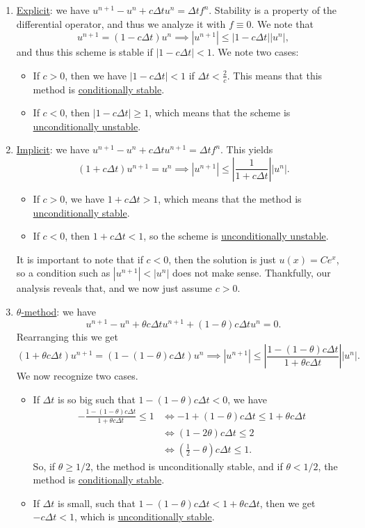 \documentclass{article}
\begin{document}
\begin{enumerate}
    \item \underline{Explicit}: we have $u^{n+1}-u^n + c\Delta t u^n = \Delta t f^n$. Stability is a property of the differential operator, and thus we analyze it with $f\equiv 0$. We note that
    $$u^{n+1} = (1-c\Delta t)u^n \implies |u^{n+1}|\leq |1-c\Delta t||u^n|,$$
    and thus this scheme is stable if $|1-c\Delta t|< 1$. We note two cases:
    \begin{itemize}
        \item If $c > 0$, then we have $|1-c\Delta t|<1$ if $\Delta t < \frac{2}{c}$. This means that this method is \underline{conditionally stable}. 
        \item If $c< 0$, then $|1-c\Delta t|\geq 1$, which means that the scheme is \underline{unconditionally unstable}.
    \end{itemize} 
    \item \underline{Implicit}: we have $u^{n+1}-u^n + c\Delta tu^{n+1} = \Delta t f^n$. This yields
    $$(1+c\Delta t) u^{n+1} = u^n \implies |u^{n+1}| \leq \left|\frac{1}{1+c\Delta t}\right| |u^{n}|.$$
    \begin{itemize}
        \item If $c > 0$,  we have $1+c\Delta t >1$, which means that the method is \underline{unconditionally stable}. 
        \item If $c < 0$, then $1+c\Delta t <1$, so the scheme is \underline{unconditionally unstable}.
    \end{itemize}     
    It is important to note that if $c<0$, then the solution is just $u(x) = Ce^x$, so a condition such as $|u^{n+1}|<|u^n|$ does not make sense. Thankfully, our analysis reveals that, and we now just assume $c>0$. 
    \item \underline{$\theta$-method}: we have
    $$
    u^{n+1}-u^n + \theta c\Delta t u^{n+1} + (1-\theta)c\Delta t u^n = 0.
    $$
    Rearranging this we get
    $$
    (1+\theta c\Delta t)u^{n+1} = (1- (1-\theta)c\Delta t) u^n \implies |u^{n+1}| \leq \left|\frac{1-(1-\theta)c\Delta t}{1+\theta c\Delta t}\right| |u^n|.
    $$
    We now recognize two cases. 
    \begin{itemize}
        \item If $\Delta t$ is so big such that $1-(1-\theta)c\Delta t < 0$, we have
        \begin{align*}
            -\frac{1-(1-\theta)c\Delta t}{1+\theta c\Delta t} \leq 1 &\iff -1+(1-\theta)c\Delta t \leq 1+\theta c\Delta t\\
            &\iff (1-2\theta) c\Delta t \leq 2\\
            &\iff \left(\frac{1}{2}-\theta\right)c\Delta t\leq 1.
        \end{align*}
        So, if $\theta\geq 1/2$, the method is unconditionally stable, and if $\theta <1/2$, the method is \underline{conditionally stable}. 
        \item If $\Delta t$ is small, such that $1-(1-\theta)c\Delta t < 1 + \theta c \Delta t$, then we get $-c\Delta t < 1$, which is \underline{unconditionally stable}. 
    \end{itemize}
\end{enumerate}
\end{document}

